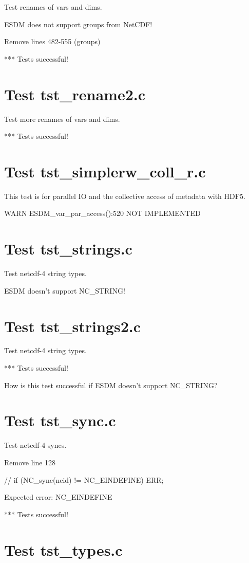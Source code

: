 Test renames of vars and dims.

ESDM does not support groups from NetCDF!

Remove lines 482-555 (groups)

*** Tests successful!

\section{Test tst\_rename2.c}

Test more renames of vars and dims.

*** Tests successful!

\section{Test tst\_simplerw\_coll\_r.c}

This test is for parallel IO and the collective access of metadata with HDF5.

WARN ESDM\_var\_par\_access():520 NOT IMPLEMENTED

\section{Test tst\_strings.c}

Test netcdf-4 string types.

ESDM doesn't support NC\_STRING!

\section{Test tst\_strings2.c}

Test netcdf-4 string types.

*** Tests successful!

How is this test successful if ESDM doesn't support NC\_STRING?

\section{Test tst\_sync.c}

Test netcdf-4 syncs.

Remove line 128

// if (NC\_sync(ncid) != NC\_EINDEFINE) ERR;

Expected error: NC\_EINDEFINE

*** Tests successful!

\section{Test tst\_types.c}

